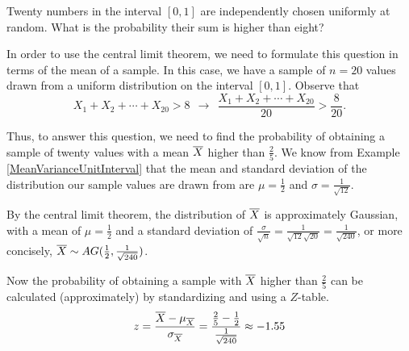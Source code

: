 \begin{example}\label{CLTExamp}Twenty numbers in the interval $[0,1]$ are independently chosen uniformly at random. What is the probability their sum is higher than eight?

In order to use the central limit theorem, we need to formulate this question in terms of the mean of a sample. In this case, we have a sample of $n=20$ values drawn from a uniform distribution on the interval $[0,1]$. Observe that
$$X_1 + X_2 + \cdots + X_{20} > 8 \ \ \rightarrow \ \  \frac{X_1 + X_2 + \cdots + X_{20} }{20} > \frac{8}{20}.$$

Thus, to answer this question, we need to find the probability of obtaining a sample of twenty values with a mean ${\overline{X}}$ higher than $\frac{2}{5}$. We know from Example \ref{MeanVarianceUnitInterval} that the mean and standard deviation of the distribution our sample values are drawn from are $\mu = \frac{1}{2}$ and $\sigma = \frac{1}{\sqrt{12}}$.

By the central limit theorem, the distribution of ${\overline{X}}$ is approximately Gaussian, with a mean of $\mu = \frac{1}{2}$ and a standard deviation of $\frac{\sigma}{\sqrt{n}} = \frac{1}{\sqrt{12}\sqrt{20}} = \frac{1}{\sqrt{240}}$, or more concisely, ${\overline{X}} \sim AG(\frac{1}{2}, \frac{1}{\sqrt{240}})$.

Now the probability of obtaining a sample with ${\overline{X}}$ higher than $\frac{2}{5}$ can be calculated (approximately) by standardizing and using a $Z$-table.
$$z = \frac{{\overline{X}} - \mu_{\overline{X}}}{\sigma_{\overline{X}}} = \frac{\frac{2}{5} - \frac{1}{2}}{\frac{1}{\sqrt{240}}} \approx -1.55$$
\begin{center}
    \begin{minipage}{.5\textwidth}
        \centering
  \vspace{1.25em}
    \end{minipage}%
    \begin{minipage}{0.5\textwidth}
        \centering
\end{minipage}
\end{center}


\end{example}
